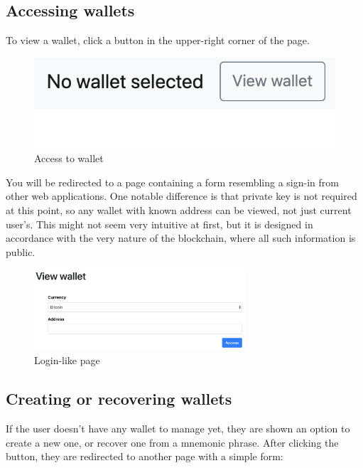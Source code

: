 \subsection{Accessing wallets}

To view a wallet, click a button in the upper-right corner of the page.

\begin{figure}[ht]
    \centering
    \includegraphics{assets/view-wallet.png}
    \caption{Access to wallet}
    \label{5:fig:view-wallet}
\end{figure}

You will be redirected to a page containing a form resembling
a sign-in from other web applications.
One notable difference is that private key is not required at this point,
so any wallet with known address can be viewed, not just current user's.
This might not seem very intuitive at first,
but it is designed in accordance with the very nature of the blockchain,
where all such information is public.

\begin{figure}[ht]
    \centering
    \includegraphics[width=0.7\textwidth]{assets/login.png}
    \caption{Login-like page}
    \label{5:fig:login}
\end{figure}

\newpage

\subsection{Creating or recovering wallets}

If the user doesn't have any wallet to manage yet,
they are shown an option to create a new one,
or recover one from a mnemonic phrase.
After clicking the button, they are redirected to another page
with a simple form:

